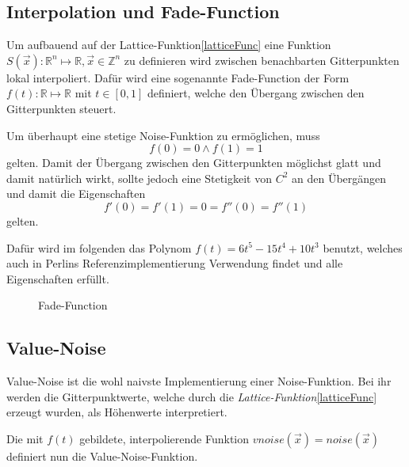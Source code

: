 \subsection{Interpolation und Fade-Function}
Um aufbauend auf der Lattice-Funktion\ref{latticeFunc} eine Funktion $S(\vec{x}): \mathbb{R}^n\mapsto\mathbb{R}, \vec{x}\in \mathbb{Z}^n$\label{S} zu definieren wird zwischen benachbarten Gitterpunkten lokal interpoliert. Dafür wird eine sogenannte Fade-Function\cite{fadeFunction} der Form $f(t): \mathbb{R}\mapsto\mathbb{R}$ mit $t\in[0, 1]$ definiert, welche den Übergang zwischen den Gitterpunkten steuert.

Um überhaupt eine stetige Noise-Funktion zu ermöglichen, muss 
\begin{equation}
f(0) = 0 \land f(1) = 1
\end{equation} gelten.
Damit der Übergang zwischen den Gitterpunkten möglichst glatt und damit natürlich wirkt, sollte jedoch eine Stetigkeit von $C^2$ an den Übergängen und damit die Eigenschaften 
\begin{equation}
	f'(0) = f'(1) = 0 = f''(0) = f''(1)
\end{equation} 
gelten.

Dafür wird im folgenden das Polynom $f(t) = 6t^5-15t^4+10t^3$ benutzt, welches auch in Perlins Referenzimplementierung Verwendung findet\cite{BurgerGradientNoise2008} und alle Eigenschaften erfüllt.
\begin{figure}[!hbtp]%
	\centering
	\caption{Fade-Function}
\end{figure}

\subsection{Value-Noise}\label{Value-Noise}
Value-Noise ist die wohl naivste Implementierung einer Noise-Funktion. Bei ihr werden die Gitterpunktwerte, welche durch die \emph{Lattice-Funktion}\ref{latticeFunc} erzeugt wurden, als Höhenwerte interpretiert.

Die mit $f(t)$ gebildete, interpolierende Funktion $vnoise(\vec{x}) = noise(\vec{x})$ definiert nun die Value-Noise-Funktion.

